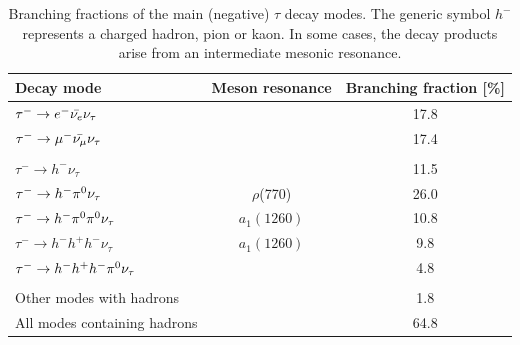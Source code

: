 \begin{table}[]
    \centering
    \begin{tabular}{l c c}
        \hline
         Decay mode & Meson resonance & Branching fraction [\%] \\
         \hline
         $\tau^- \rightarrow e^- \Bar{\nu_e} \nu_\tau$ & & 17.8 \\
         $\tau^- \rightarrow \mu^- \Bar{\nu_\mu} \nu_\tau$ & & 17.4 \\
         & &  \\
         $\tau^- \rightarrow h^- \nu_\tau$ & & 11.5 \\
         $\tau^- \rightarrow h^- \pi^{0} \nu_\tau$ & $\rho$(770) & 26.0 \\
         $\tau^- \rightarrow h^- \pi^{0} \pi^{0} \nu_\tau$ & $a_1(1260)$ & 10.8 \\
         $\tau^- \rightarrow h^- h^+ h^- \nu_\tau$ & $a_1(1260)$ & 9.8 \\
         $\tau^- \rightarrow h^- h^+ h^- \pi^{0} \nu_\tau$ & & 4.8 \\
         & &  \\
         Other modes with hadrons & & 1.8 \\
         All modes containing hadrons & & 64.8 \\
         \hline
    \end{tabular}
    \caption{Branching fractions of the main (negative) $\tau$ decay modes. The generic symbol $h^-$ represents a charged hadron, pion or kaon. In some cases, the decay products arise from an intermediate mesonic resonance.}
    \label{tab:tau_decay_products}
\end{table}
